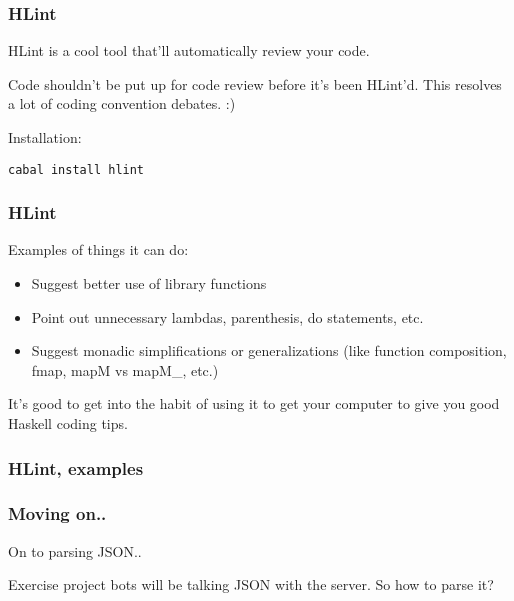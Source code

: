 \documentclass{beamer}
\begin{document}
\begin{frame}[fragile]
\frametitle{HLint}

HLint is a cool tool that'll automatically review your code.

\bigskip
Code shouldn't be put up for code review before it's been HLint'd.
This resolves a lot of coding convention debates. :)

\bigskip
Installation:
\begin{verbatim}
cabal install hlint
\end{verbatim}

\end{frame}


\begin{frame}[fragile]
\frametitle{HLint}

Examples of things it can do:

\begin{itemize}
  \item Suggest better use of library functions
  \item Point out unnecessary lambdas, parenthesis, do statements, etc.
  \item Suggest monadic simplifications or generalizations (like
    function composition, fmap, mapM vs mapM\_, etc.)
\end{itemize}
\bigskip

It's good to get into the habit of using it to get your computer to
give you good Haskell coding tips.

\end{frame}


\begin{frame}[fragile]
\frametitle{HLint, examples}



\end{frame}


\begin{frame}[fragile]
\frametitle{Moving on..}

On to parsing JSON..
\bigskip

Exercise project bots will be talking JSON with the server.  So how to
parse it?

\end{frame}
\end{document}
